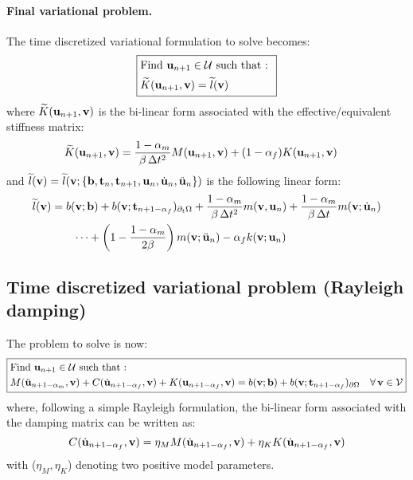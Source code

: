 \paragraph{Final variational problem.}

The time discretized variational formulation to solve becomes:
\begin{equation}
\boxed{\begin{aligned} & \text{Find \ensuremath{{\bf{u}}_{n+1}\in\mathcal{U}} such that : }\\
 & \widetilde{K}({{\bf{u}}_{n+1}},{\bf{v}})=\widetilde{l}({\bf{v}})
\end{aligned}
}
\end{equation}
where $ \widetilde{K}({{\bf{u}}_{n+1}},{\bf{v}})$ is the bi-linear form associated with
the effective/equivalent stiffness matrix:
\begin{equation}
\begin{aligned}\widetilde{K}({{\bf{u}}_{n+1}},{\bf{v}}) & =\frac{1-\alpha_{m}}{\beta\,\Delta t^{2}}M({\bf{u}}_{n+1},{\bf{v}})+(1-\alpha_{f})K({\bf{u}}_{n+1},{\bf{v}})\end{aligned}
\end{equation}
and $\widetilde{l}({\bf{v}})=\widetilde{l}({\bf{v}};\left\{ {\bf{b}},{\bf t}_{n},{\bf t}_{n+1},{\bf{u}}_{n},\dot{{\bf{u}}}_{n},\ddot{{\bf{u}}}_{n}\right\} )$
is the following linear form:
\begin{equation}
\begin{aligned}\widetilde{l}({\bf{v}}) & =b({\bf{v}};{\bf{b}})+b({\bf{v}};{\bf t}_{n+1-\alpha_{f}})_{\partial_{t}\Omega}+\frac{1-\alpha_{m}}{\beta\,\Delta t^{2}}m({\bf{v}},{\bf{u}}_{n})+\frac{1-\alpha_{m}}{\beta\,\Delta t}m({\bf{v}};\dot{{\bf{u}}}_{n})\\
 & \qquad\cdots+\left(1-\frac{1-\alpha_{m}}{2\beta}\right)m({\bf{v}};\ddot{{\bf{u}}}_{n})-\alpha_{f}k({\bf{v}};{{\bf{u}}_{n}})
\end{aligned}
\end{equation}


\subsection{Time discretized variational problem (Rayleigh damping)}

The problem to solve is now:
\begin{equation}
\boxed{\begin{aligned} & \text{Find \ensuremath{{\bf{u}}_{n+1}\in\mathcal{U}} such that : }\\
 & M(\ddot{{\bf{u}}}_{n+1-\alpha_{m}},{\bf{v}})+C(\dot{{\bf{u}}}_{n+1-\alpha_{f}},{\bf{v}})+K({\bf{u}}_{n+1-\alpha_{f}},{\bf{v}})=b({\bf{v}};{\bf{b}})+b({\bf{v}};{\bf t}_{n+1-\alpha_{f}})_{\partial\Omega}\quad\text{\ensuremath{\forall\,}}{\bf{v}}\in\mathcal{V}
\end{aligned}
}\label{eq:variational_pb_damping_1}
\end{equation}
where, following a simple Rayleigh formulation, the bi-linear form associated with the damping matrix can be written as:
\begin{equation}
C(\dot{{\bf{u}}}_{n+1-\alpha_{f}},{\bf{v}})=\eta_{M}M(\dot{{\bf{u}}}_{n+1-\alpha_{f}},{\bf{v}})+\eta_{K}K(\dot{{\bf{u}}}_{n+1-\alpha_{f}},{\bf{v}})
\end{equation}
with ($\eta_{M},\eta_{K}$) denoting two positive model parameters.

